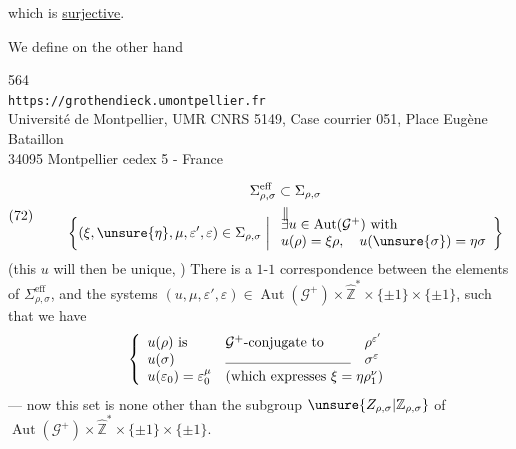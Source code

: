 
which is  \uline{surjective}.

We define on the other hand


{\small
\begin{center}
564\\
\texttt{https://grothendieck.umontpellier.fr}\\
Université de Montpellier, UMR CNRS 5149, Case courrier 051, Place Eugène Bataillon\\
34095 Montpellier cedex 5 - France
\end{center}
}


\[
\text{(72)}\qquad
\begin{gathered}
\Sigma_{\rho,\sigma}^{\mathrm{eff}}\subset\Sigma_{\rho,\sigma}\\
\begin{array}{c}
\Vert\\[-0.4em]
\displaystyle\left\{(\xi,\unsure{\eta},\mu,\varepsilon',\varepsilon)\in\Sigma_{\rho,\sigma}\;\middle|\;
\begin{array}{l}
\exists u\in\operatorname{Aut}(\mathcal{G}^{+})\ \text{with}\\
u(\rho)=\xi\rho,\quad u(\unsure{\sigma})=\eta\sigma
\end{array}\right\}
\end{array}
\end{gathered}
\]
(this $u$ will then be unique, ) There is a $1$-$1$ correspondence between the elements of $\Sigma_{\rho,\sigma}^{\mathrm{eff}}$, and the systems $(u,\mu,\varepsilon',\varepsilon)\in\operatorname{Aut}(\mathcal{G}^{+})\times\widehat{\mathbb Z}^{*}\times\{\pm1\}\times\{\pm1\}$, such that we have 
\[
\left\{\begin{array}{lll}
u(\rho)\text{ is}&\mathcal{G}^{+}\text{-conjugate to}&\rho^{\varepsilon'}\\
u(\sigma)&\rule{9em}{0.35pt}&\sigma^{\varepsilon}\\
u(\varepsilon_{0})=\varepsilon_{0}^{\mu}&\multicolumn{2}{l}{(\text{which expresses }\xi=\eta\rho_{1}^{\nu})}
\end{array}\right.
\]
--- now this set is none other than the subgroup $\unsure{Z_{\rho,\sigma}|\mathbb Z_{\rho,\sigma}}$ of $\operatorname{Aut}(\mathcal{G}^{+})\times\widehat{\mathbb Z}^{*}\times\{\pm1\}\times\{\pm1\}$. 

